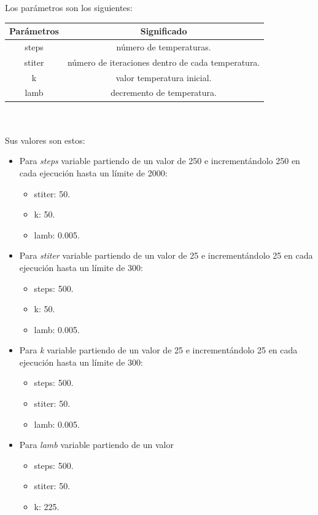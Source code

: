 \documentclass[a4paper,10pt]{report}
\begin{document}
		Los parámetros son los siguientes:\\
		
		\begin{tabular}{c|c}
		\centering
		    Parámetros & Significado \\
		    \hline
		    \hline
		    steps & número de temperaturas. \\
		    \hline
		    stiter & número de iteraciones dentro de cada temperatura. \\
		    \hline
		    k & valor temperatura inicial. \\ 
		    \hline
		    lamb & decremento de temperatura. \\
		\end{tabular}\\\\
		
		Sus valores son estos:
		\begin{itemize}
		    \item Para \textit{steps} variable partiendo de un valor de 250 e incrementándolo 250 en cada ejecución hasta un límite de 2000:

		    \begin{itemize}
		        \item stiter: 50.
		        \item k: 50.
		        \item lamb: 0.005.
		    \end{itemize}
		    \item Para \textit{stiter} variable partiendo de un valor de 25 e incrementándolo 25 en cada ejecución hasta un límite de 300:
		    \begin{itemize}
		        \item steps: 500.
		        \item k: 50.
		        \item lamb: 0.005.
		    \end{itemize}
		    \item Para \textit{k} variable partiendo de un valor de 25 e incrementándolo 25 en cada ejecución hasta un límite de 300:
		    \begin{itemize}
		        \item steps: 500.
		        \item stiter: 50.
		        \item lamb: 0.005.
		    \end{itemize}
		    \item Para \textit{lamb} variable partiendo de un valor
		    \begin{itemize}
		        \item steps: 500.
		        \item stiter: 50.
		        \item k: 225.
		    \end{itemize}
		\end{itemize}
		
\end{document}

